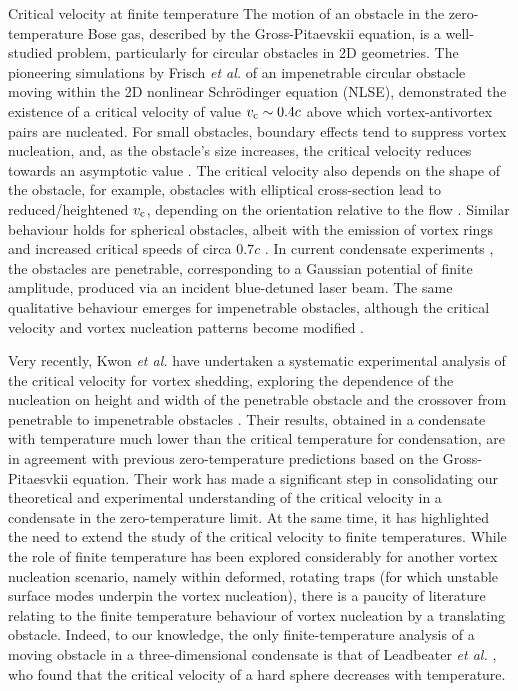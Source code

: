 \begin{chapter}{\label{cha:nonequib}Critical velocity at finite temperature}
The motion of an obstacle in the zero-temperature Bose gas, described by the Gross-Pitaevskii equation, is a well-studied problem, particularly for circular obstacles in 2D geometries.  The pioneering simulations by Frisch {\it et al.} \cite{frisch92} of an impenetrable circular obstacle moving within the 2D nonlinear Schr\"odinger equation (NLSE),
demonstrated the existence of a critical velocity of value
$v_{\rm c}\sim 0.4c$ above which vortex-antivortex pairs are nucleated.
For small obstacles, boundary effects tend to suppress vortex nucleation,
and, as the obstacle's size increases,
the critical velocity reduces towards an asymptotic value \cite{berloff2000,rica2001,pham2004}.  The critical velocity also depends on the shape of the obstacle, for example, obstacles with elliptical cross-section lead to reduced/heightened $v_{\rm c}$, depending on the orientation relative to the flow \cite{stagg_parker_14, stagg_2015b}. Similar behaviour holds for spherical obstacles, albeit with the emission of vortex rings and increased critical speeds of circa $0.7 c$ \cite{winiecki_2000,win01,stagg_parker_14}.
In current condensate experiments \cite{Neely,kwon_moon_14,Raman,Onofrio,Inouye,desbuquois_2012, kwon_2015a,kwon_2015b}, the obstacles are penetrable, corresponding to a Gaussian potential of finite amplitude, produced via an incident blue-detuned laser beam.
The same qualitative behaviour emerges for impenetrable obstacles,
although the critical velocity and vortex nucleation patterns become modified \cite{saito10}.

Very recently, Kwon {\it et al.} have undertaken
a systematic experimental analysis of the critical velocity for vortex
shedding, exploring the dependence of the nucleation
on height and width of the penetrable obstacle and the crossover
from penetrable to impenetrable obstacles \cite{kwon_2015a}.
Their results, obtained in a condensate with temperature much lower than
the critical temperature for condensation, are
in agreement with previous zero-temperature predictions based on the
Gross-Pitaesvkii equation.
Their work has made a significant step in consolidating our
theoretical and experimental understanding of the critical velocity
in a condensate in the zero-temperature limit.  At the same time,
it has highlighted the need to extend the study
of the critical velocity to finite temperatures.
While the role of finite temperature has been explored considerably for another vortex nucleation scenario, namely within deformed, rotating traps \cite{hodby_2002,abo_shaeer_2002,williams_2002,penckwitt_2002,kasamatsu_2003,lobo_2004} (for which unstable surface modes underpin the vortex nucleation), there is a paucity of literature relating to the finite temperature behaviour of vortex nucleation by a translating obstacle.  Indeed, to our knowledge, the only finite-temperature analysis of a moving obstacle in a three-dimensional condensate is that of Leadbeater {\it et al.}
\cite{leadbeater_2003},
who found that the critical velocity of a hard sphere decreases
with temperature.


\end{chapter}
